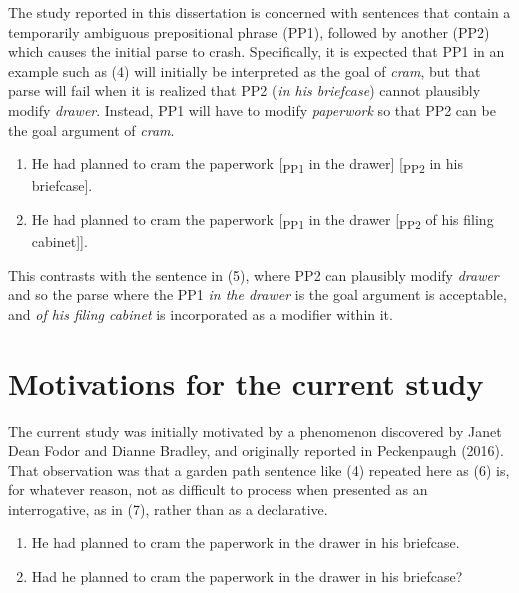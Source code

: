 \documentclass[11pt,oneside]{book}
\begin{document}
The study reported in this dissertation is concerned with sentences that contain a temporarily ambiguous prepositional phrase (PP1), followed by another (PP2) which causes the initial parse to crash. Specifically, it is expected that PP1 in an example such as (4) will initially be interpreted as the goal of \emph{cram}, but that parse will fail when it is realized that PP2 (\emph{in his briefcase}) cannot plausibly modify \emph{drawer}. Instead, PP1 will have to modify \emph{paperwork} so that PP2 can be the goal argument of \emph{cram}.

\begin{enumerate}
\def\labelenumi{(\arabic{enumi})}
\setcounter{enumi}{3}
\item
  He had planned to cram the paperwork {[}\textsubscript{PP1} in the drawer{]} {[}\textsubscript{PP2} in his briefcase{]}.
\item
  He had planned to cram the paperwork {[}\textsubscript{PP1} in the drawer {[}\textsubscript{PP2} of his filing cabinet{]}{]}.
\end{enumerate}

This contrasts with the sentence in (5), where PP2 can plausibly modify \emph{drawer} and so the parse where the PP1 \emph{in the drawer} is the goal argument is acceptable, and \emph{of his filing cabinet} is incorporated as a modifier within it.

\hypertarget{obs}{%
\section{Motivations for the current study}\label{obs}}

The current study was initially motivated by a phenomenon discovered by Janet Dean Fodor and Dianne Bradley, and originally reported in Peckenpaugh (2016). That observation was that a garden path sentence like (4) repeated here as (6) is, for whatever reason, not as difficult to process when presented as an interrogative, as in (7), rather than as a declarative.

\begin{enumerate}
\def\labelenumi{(\arabic{enumi})}
\setcounter{enumi}{5}
\item
  He had planned to cram the paperwork in the drawer in his briefcase.
\item
  Had he planned to cram the paperwork in the drawer in his briefcase?
\end{enumerate}
\end{document}
